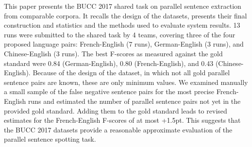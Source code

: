 This paper presents the BUCC 2017 shared task on parallel sentence extraction from comparable corpora.  It recalls the design of the datasets, presents their final construction and statistics and the methods used to evaluate system results. 13 runs were submitted to the shared task by 4 teams, covering three of the four proposed language pairs: French-English (7 runs), German-English (3 runs), and Chinese-English (3 runs). The best F-scores as measured against the gold standard were 0.84 (German-English), 0.80 (French-English), and 0.43 (Chinese-English).  Because of the design of the dataset, in which not all gold parallel sentence pairs are known, these are only minimum values. We examined manually a small sample of the false negative sentence pairs for the most precise French-English runs and estimated the number of parallel sentence pairs not yet in the provided gold standard.  Adding them to the gold standard leads to revised estimates for the French-English F-scores of at most +1.5pt.  This suggests that the BUCC 2017 datasets provide a reasonable approximate evaluation of the parallel sentence spotting task.
